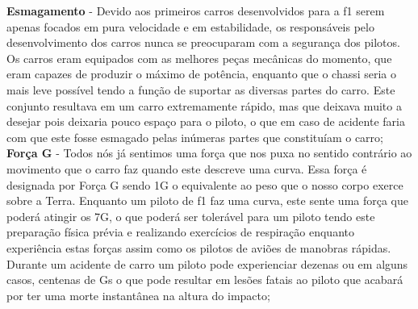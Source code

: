 \documentclass{report}
\begin{document}
\textbf{Esmagamento} -  Devido aos primeiros carros desenvolvidos para a \ac{f1} serem apenas focados em pura velocidade e em estabilidade, os responsáveis pelo desenvolvimento dos carros nunca se preocuparam com a segurança dos pilotos. Os carros eram equipados com as melhores peças mecânicas do momento, que eram capazes de produzir o máximo de potência, enquanto que o chassi seria o mais leve possível tendo a função de suportar as diversas partes do carro. Este conjunto resultava em um carro extremamente rápido, mas que deixava muito a desejar pois deixaria pouco espaço para o piloto, o que em caso de acidente faria com que este fosse esmagado pelas inúmeras partes que constituíam o carro;\\[0.5cm]

\textbf{Força G} - Todos nós já sentimos uma força que nos puxa no sentido contrário ao movimento que o carro faz quando este descreve uma curva. Essa força é designada por Força G sendo 1G o equivalente ao peso que o nosso corpo exerce sobre a Terra. Enquanto um piloto de \ac{f1} faz uma curva, este sente uma força que poderá atingir os 7G, o que poderá ser tolerável para um piloto tendo este preparação física prévia e realizando exercícios de respiração enquanto experiência estas forças assim como os pilotos de aviões de manobras rápidas.
Durante um acidente de carro um piloto pode experienciar dezenas ou em alguns casos, centenas de Gs o que pode resultar em lesões fatais ao piloto que acabará por ter uma morte instantânea na altura do impacto;\\[2.5cm]
\end{document}
